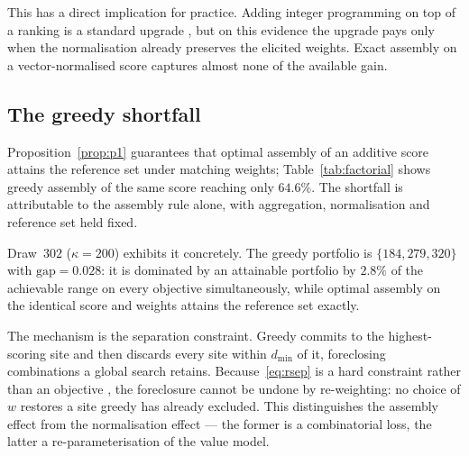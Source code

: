 This has a direct implication for practice.
Adding integer programming on top of a ranking is a standard upgrade
\citep{BransMareschal1992,Mavrotas2006,VetscheraDeAlmeida2012},
but on this evidence the upgrade pays only when the normalisation
already preserves the elicited weights.
Exact assembly on a vector-normalised score captures almost none of the
available gain.



\subsection{The greedy shortfall}
\label{sec:greedy}

Proposition~\ref{prop:p1} guarantees that optimal assembly of an
additive score attains the reference set under matching weights;
Table~\ref{tab:factorial} shows greedy assembly of the same score
reaching only $64.6\%$.
The shortfall is attributable to the assembly rule alone, with
aggregation, normalisation and reference set held fixed.

Draw~$302$ ($\kappa=200$) exhibits it concretely.
The greedy portfolio is $\{184,279,320\}$ with $\mathrm{gap}=0.028$:
it is dominated by an attainable portfolio by $2.8\%$ of the achievable
range on every objective simultaneously, while optimal assembly on the
identical score and weights attains the reference set exactly.

The mechanism is the separation constraint.
Greedy commits to the highest-scoring site and then discards every site
within $d_{\min}$ of it, foreclosing combinations a global search
retains.
Because~\eqref{eq:rsep} is a hard constraint rather than an objective
\citep{Erkut1996,MoonChaudhry1984}, the foreclosure cannot be undone by
re-weighting: no choice of $w$ restores a site greedy has already
excluded.
This distinguishes the assembly effect from the normalisation effect
--- the former is a combinatorial loss, the latter a re-parameterisation
of the value model.
